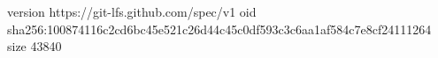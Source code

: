 version https://git-lfs.github.com/spec/v1
oid sha256:100874116c2cd6bc45e521c26d44c45c0df593c3c6aa1af584c7e8cf24111264
size 43840
